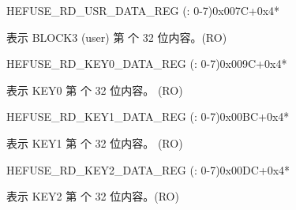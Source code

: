 \begin{register}{H}{EFUSE\_RD\_USR\_DATA\_REG (: 0-7)}{0x007C+0x4*}\label{regdesc:EFUSERDUSRDATANREG}
%
\regnewline%
\begin{regdesc}\begin{reglist}
\label{fielddesc:EFUSEUSRDATAN}\item [EFUSE\_USR\_DATA\regindex{n}] 表示 BLOCK3 (user) 第  个 32 位内容。(RO)
\end{reglist}\end{regdesc}
\end{register}


\begin{register}{H}{EFUSE\_RD\_KEY0\_DATA\_REG (: 0-7)}{0x009C+0x4*}\label{regdesc:EFUSERDKEY0DATANREG}
%
\regnewline%
\begin{regdesc}\begin{reglist}
\label{fielddesc:EFUSEKEY0DATAN}\item [EFUSE\_KEY0\_DATA\regindex{n}] 表示 KEY0 第  个 32 位内容。 (RO)
\end{reglist}\end{regdesc}
\end{register}


\begin{register}{H}{EFUSE\_RD\_KEY1\_DATA\_REG (: 0-7)}{0x00BC+0x4*}\label{regdesc:EFUSERDKEY1DATANREG}
%
\regnewline%
\begin{regdesc}\begin{reglist}
\label{fielddesc:EFUSEKEY1DATAN}\item [EFUSE\_KEY1\_DATA\regindex{n}] 表示 KEY1 第  个 32 位内容。 (RO)
\end{reglist}\end{regdesc}
\end{register}


\begin{register}{H}{EFUSE\_RD\_KEY2\_DATA\_REG (: 0-7)}{0x00DC+0x4*}\label{regdesc:EFUSERDKEY2DATANREG}
%
\regnewline%
\begin{regdesc}\begin{reglist}
\label{fielddesc:EFUSEKEY2DATAN}\item [EFUSE\_KEY2\_DATA\regindex{n}] 表示 KEY2 第  个 32 位内容。(RO)
\end{reglist}\end{regdesc}
\end{register}


